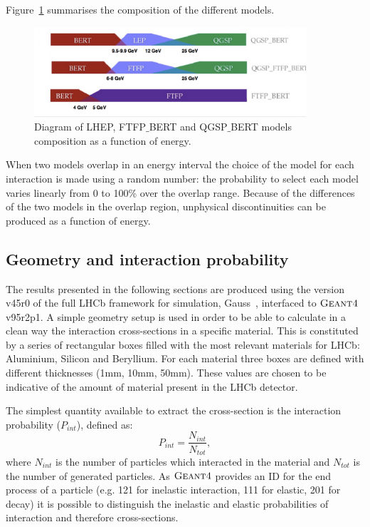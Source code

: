 Figure~\ref{fig:models} summarises the composition of the different models.
%
\begin{center}
\begin{figure}[b]
\centering \includegraphics[width=0.9\textwidth]{detector/figs/validation/models.png}
\caption{Diagram of LHEP, FTFP$\_$BERT and QGSP$\_$BERT models composition as a function of energy.}
\label{fig:models}
\end{figure}
\end{center}
%
When two models overlap in an energy interval the choice of the model
for each interaction is made using a random number: the probability to select each model varies linearly
from 0 to 100\% over the overlap range. Because of the differences of the two models in the overlap region,
unphysical discontinuities can be produced as a function of energy.

\subsection{Geometry and interaction probability}
\label{GeomandPint}

The results presented in the following sections are produced using the version v45r0 of the full LHCb framework
for simulation, Gauss~\cite{LHCb-PROC-2011-006}, interfaced to $\textsc{Geant4}$ v95r2p1.
A simple geometry setup is used in order to be able to calculate in a clean way the interaction cross-sections
in a specific material. This is constituted by a series of rectangular boxes filled with the most relevant materials
for LHCb: Aluminium, Silicon and Beryllium. For each material three boxes are defined with different thicknesses
(1mm, 10mm, 50mm). These values are chosen to be indicative of the amount of material present in the LHCb detector.

The simplest quantity available to extract the cross-section is the interaction probability ($P_{int}$), defined as:
%
\begin{equation}
P_{int} = \frac{N_{int}}{N_{tot}},
\end{equation}
%
where $N_{int}$ is the number of particles which interacted in the material and $N_{tot}$ is the number of generated particles.
As $\textsc{Geant4}$ provides an ID for the end process of a particle (e.g. 121 for inelastic interaction, 111 for elastic, 
201 for decay) it is possible to distinguish the inelastic and elastic probabilities of interaction and therefore cross-sections.

